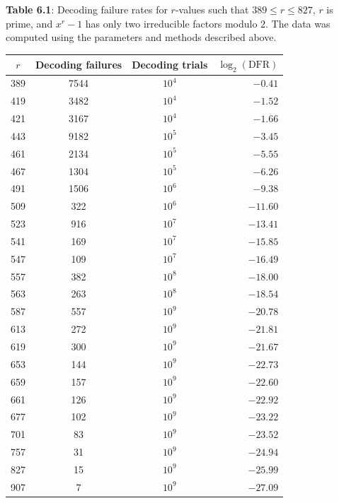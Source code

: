 \newpage

\begin{flushleft}
    \textbf{Table 6.1}: Decoding failure rates for $r$-values such that $389 \leq r \leq 827$, $r$ is prime, and $x^r - 1$ has only two irreducible factors modulo $2$. The data was computed using the parameters and methods described above.
    \end{flushleft}
\begin{table}[htb]
    \begin{center}
        \begin{tabular}{c|c|c|r}
            \;\;\;$r$\;\;\; & \;Decoding failures\;  & \;Decoding trials\;  & \;$\log_2(\mathrm{DFR})$ \\
            \hline
            389 & 7544 & $10^4$ & $-0.41$ \\
            419 & 3482 & $10^4$ & $-1.52$ \\
            421 & 3167 & $10^4$ & $-1.66$ \\
            443 & 9182 & $10^5$ & $-3.45$ \\
            461 & 2134 & $10^5$ & $-5.55$ \\
            467 & 1304 & $10^5$ & $-6.26$ \\
            491 & 1506 & $10^6$ & $-9.38$ \\
            509 & 322 & $10^6$ & $-11.60$ \\
            523 & 916 & $10^7$ & $-13.41$ \\
            541 & 169 & $10^7$ & $-15.85$ \\
            547 & 109 & $10^7$ & $-16.49$ \\
            557 & 382 & $10^8$ & $-18.00$ \\
            563 & 263 & $10^8$ & $-18.54$ \\
            587 & 557 & $10^9$ & $-20.78$ \\
            613 & 272 & $10^9$ & $-21.81$ \\
            619 & 300 & $10^9$ & $-21.67$ \\
            653 & 144 & $10^9$ & $-22.73$ \\
            659 & 157 & $10^9$ & $-22.60$ \\
            661 & 126 & $10^9$ & $-22.92$ \\
            677 & 102 & $10^9$ & $-23.22$ \\
            701 & 83 & $10^9$ & $-23.52$ \\
            757 & 31 & $10^9$ & $-24.94$ \\
            827 & 15 & $10^9$ & $-25.99$ \\
	    907 & 7 & $10^9$ & $-27.09$
        \end{tabular}
    \end{center}
    \label{table:DFR}
\end{table}
